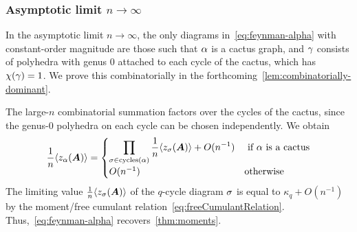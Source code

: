 \subsubsection{Asymptotic limit \texorpdfstring{$n\to\infty$}{n -> infty}}

In the asymptotic limit $n \to \infty$,
the only diagrams in~\cref{eq:feynman-alpha} with constant-order magnitude are those such that $\alpha$ is a cactus graph, and $\gamma$ consists of polyhedra with genus 0 attached to each cycle of the cactus, which has $\chi(\gamma) = 1$.
We prove this combinatorially in the forthcoming~\cref{lem:combinatorially-dominant}.

The large-$n$ combinatorial summation factors over the cycles of the cactus, since the genus-0 polyhedra on each cycle can be chosen independently.
We obtain
\begin{equation*}
    \frac 1n \langle z_\alpha({\bm A}) \rangle = \begin{cases}
        \displaystyle\prod_{\sigma \in \operatorname{cycles}(\alpha)} \frac 1n \langle z_\sigma({\bm A})\rangle  + O(n^{-1}) &\text{ if $\alpha$ is a cactus}\\
        O(n^{-1}) & \text{otherwise}
    \end{cases}
\end{equation*}
The limiting value $\frac 1n \langle z_\sigma({\bm A})\rangle$ of the $q$-cycle diagram $\sigma$ is equal to $\kappa_{q} + O(n^{-1})$ by the moment/free cumulant relation~\cref{eq:freeCumulantRelation}. Thus,~\cref{eq:feynman-alpha} recovers~\cref{thm:moments}.


